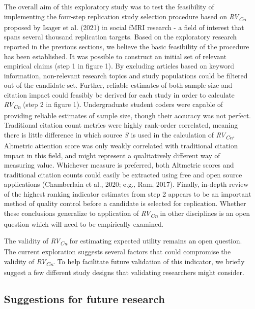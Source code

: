 \documentclass[
  man,floatsintext]{apa6}
\begin{document}
The overall aim of this exploratory study was to test the feasibility of implementing the four-step replication study selection procedure based on \emph{RV\textsubscript{Cn}} proposed by Isager et al. (2021) in social fMRI research - a field of interest that spans several thousand replication targets. Based on the exploratory research reported in the previous sections, we believe the basic feasibility of the procedure has been established. It was possible to construct an initial set of relevant empirical claims (step 1 in figure 1). By excluding articles based on keyword information, non-relevant research topics and study populations could be filtered out of the candidate set. Further, reliable estimates of both sample size and citation impact could feasibly be derived for each study in order to calculate \emph{RV\textsubscript{Cn}} (step 2 in figure 1). Undergraduate student coders were capable of providing reliable estimates of sample size, though their accuracy was not perfect. Traditional citation count metrics were highly rank-order correlated, meaning there is little difference in which source \(S\) is used in the calculation of \emph{RV\textsubscript{Cn}}. Altmetric attention score was only weakly correlated with traditional citation impact in this field, and might represent a qualitatively different way of measuring value. Whichever measure is preferred, both Altmetric scores and traditional citation counts could easily be extracted using free and open source applications (Chamberlain et al., 2020; e.g., Ram, 2017). Finally, in-depth review of the highest ranking indicator estimates from step 2 appears to be an important method of quality control before a candidate is selected for replication. Whether these conclusions generalize to application of \emph{RV\textsubscript{Cn}} in other disciplines is an open question which will need to be empirically examined.

The validity of \emph{RV\textsubscript{Cn}} for estimating expected utility remains an open question. The current exploration suggests several factors that could compromise the validity of \emph{RV\textsubscript{Cn}}. To help facilitate future validation of this indicator, we briefly suggest a few different study designs that validating researchers might consider.

\hypertarget{suggestions-for-future-research}{%
\subsection{Suggestions for future research}\label{suggestions-for-future-research}}
\end{document}
